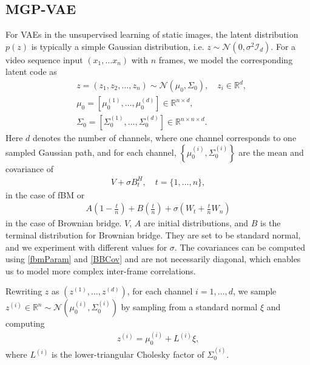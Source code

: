 \documentclass[runningheads]{llncs}
\begin{document}
   \subsection{MGP-VAE} \label{section:sampling}
   For VAEs in the unsupervised learning of static images, the latent distribution $p(z)$ is typically a simple Gaussian distribution, i.e. $z \sim \mathcal{N}(0, \sigma^2 \mathcal{I}_d)$. For a video sequence input $(x_1, \ldots x_n)$ with $n$ frames, we model the corresponding latent code as   
   \begin{align}
   &z = (z_1, z_2, \ldots, z_n) \sim \mathcal{N} (\mu_0, \Sigma_0), \quad z_i \in \mathbb{R}^d, \\ 
   &\mu_0 = \left[ \mu_0^{(1)}, \ldots, \mu_0^{(d)} \right] \in \mathbb{R}^{n \times d}, \\
   &\Sigma_0 = \left[ \Sigma_0^{(1)}, \ldots, \Sigma_0^{(d)} \right] \in \mathbb{R}^{n \times n \times d}.
   \end{align}
   Here $d$ denotes the number of channels, where one channel corresponds to one sampled Gaussian path, and for each channel, $\left\{ \mu_0^{(i)}, \Sigma_0^{(i)} \right\}$ are the mean and covariance of 
   \begin{align}
   V + \sigma B^H_t, \quad t = \{1, \ldots, n\},
   \end{align}
   in the case of fBM or
   \begin{align}
   A \left( 1 - \frac{t}{n} \right) + B \left( \frac{t}{n} \right) + \sigma \left( W_t + \frac{t}{n} W_n \right)
   \end{align}
   in the case of Brownian bridge. $V$, $A$ are initial distributions, and $B$ is the terminal distribution for Brownian bridge. They are set to be standard normal, and we experiment with different values for $\sigma$. The covariances can be computed using \eqref{fbmParam} and \eqref{BBCov} and are not necessarily diagonal, which enables us to model more complex inter-frame correlations. \par 

   Rewriting $z$ as $\left( z^{(1)}, \ldots, z^{(d)} \right)$, for each channel $i = 1, \ldots, d$, we sample $z^{(i)} \in \mathbb{R}^n \sim \mathcal{N} \left( \mu_0^{(i)}, \Sigma_0^{(i)} \right)$ by sampling from a standard normal $\xi$ and computing
   \begin{align}
   z^{(i)} = \mu_0^{(i)} + L^{(i)} \xi,
   \end{align}
   where $L^{(i)}$ is the lower-triangular Cholesky factor of $\Sigma_0^{(i)}$. \par 
\end{document}
